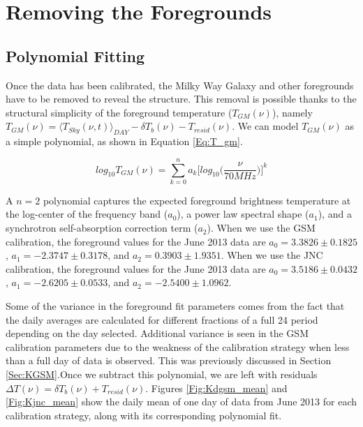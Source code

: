 \section{Removing the Foregrounds}\label{Sec:fore}


\subsection{Polynomial Fitting}

Once the data has been calibrated, the Milky Way Galaxy and other foregrounds have to be removed to reveal the \cm structure. This removal is possible thanks to the structural simplicity of the foreground temperature ($T_{GM}(\nu)$), namely $T_{GM}(\nu) = \langle T_{Sky}(\nu,t) \rangle_{DAY} - \delta T_{b} (\nu) - T_{resid} (\nu)$. We can model $T_{GM} (\nu)$ as a simple polynomial, as shown in Equation \ref{Eq:T_gm}.

\begin{equation} \label{Eq:T_gm}
log_{10} T_{GM}(\nu) = \sum_{k=0}^n a_k \Big[ log_{10} \Big(\frac{\nu}{70 MHz}\Big) \Big]^k
\end{equation}

A $n=2$ polynomial captures the expected foreground brightness temperature at the log-center of the frequency band ($a_0$), a power law spectral shape ($a_1$), and a synchrotron self-absorption correction term ($a_2$). When we use the GSM calibration, the foreground values for the June 2013 data are $a_0 = 3.3826 \pm 0.1825$, $a_1 = -2.3747 \pm 0.3178$, and $a_2 = 0.3903 \pm 1.9351$. When we use the JNC calibration, the foreground values for the June 2013 data are $a_0 = 3.5186 \pm 0.0432$, $a_1 = -2.6205 \pm 0.0533$, and $a_2 = -2.5400 \pm 1.0962$. 

Some of the variance in the foreground fit parameters comes from the fact that the daily averages are calculated for different fractions of a full 24 period depending on the day selected. Additional variance is seen in the GSM calibration parameters due to the weakness of the calibration strategy when less than a full day of data is observed. This was previously discussed in Section \ref{Sec:KGSM}.Once we subtract this polynomial, we are left with residuals $\Delta T (\nu) = \delta T_{b}(\nu)+T_{resid}(\nu)$. Figures \ref{Fig:Kdgsm_mean} and \ref{Fig:Kjnc_mean} show the daily mean of one day of data from June 2013 for each calibration strategy, along with its corresponding polynomial fit. 

